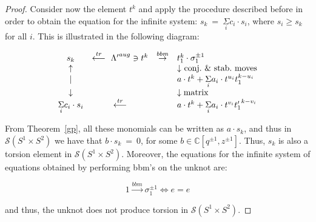 \documentclass[11pt]{amsart}
\begin{document}
\begin{proof}
\smallbreak

Consider now the element $t^k$ and apply the procedure described before in order to obtain the equation for the infinite system:
$s_k\ =\ \underset{i}{\Sigma} c_i\cdot s_i$, where $s_i \geq s_k$ for all $i$. This is illustrated in the following diagram:

\[
\begin{array}{cccl}
s_k & \overset{tr}{\longleftarrow} \ {\Lambda^{\prime}}^{aug} \ni t^k & \overset{bbm}{\rightarrow}  & t_1^k\cdot \sigma_1^{\pm 1} \\
\uparrow  &                              &                                 & {\downarrow}\ {\rm conj.} \ \&\ {\rm stab.\ moves} \\
|	&                                                &  &  a\cdot t^k + \underset{i}{\Sigma} a_i\cdot t^{u_i}t_1^{k-u_i}\\
\downarrow	&                              &                                                             &\downarrow {\rm matrix} \\
\underset{i}{\Sigma} c_i\cdot s_i	&     \overset{tr}{\longleftarrow}             &                              & a\cdot t^k + \underset{i}{\Sigma} a_i\cdot t^{v_i}{t_1^{\prime}}^{k-v_i}  \\
\end{array}
\]

From Theorem~\ref{gp}, all these monomials can be written as $a\cdot s_k$, and thus in $\mathcal{S}(S^1\times S^2)$ we have that $b\cdot s_k\ =\ 0$, for some $b\in \mathbb{C}[q^{\pm 1}, z^{\pm 1}]$. Thus, $s_k$ is also a torsion element in $\mathcal{S}(S^1\times S^2)$. Moreover, the equations for the infinite system of equations obtained by performing bbm's on the unknot are:

\[
1\overset{bbm}{\rightarrow}\sigma_1^{\pm 1} \Leftrightarrow e=e
\]

\noindent and thus, the unknot does not produce torsion in $\mathcal{S}(S^1\times S^2)$. 

\end{proof}
\end{document}
